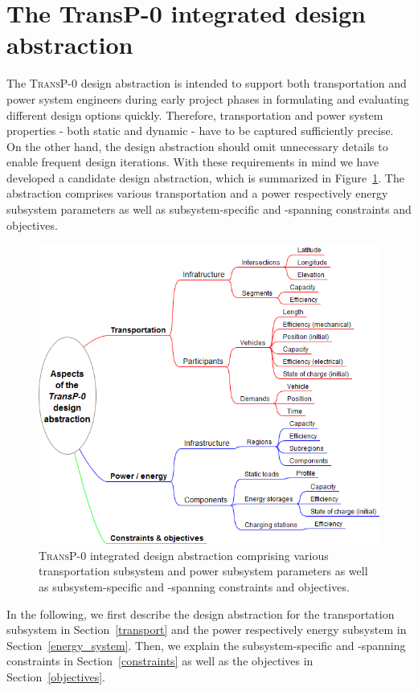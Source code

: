 \section{The \textbf{TransP-0} integrated design abstraction}
\label{proposed_model}

The \textsc{TransP-0} design abstraction is intended to support both transportation and power system engineers during early project phases in formulating and evaluating different design options quickly. Therefore, transportation and power system properties - both static and dynamic - have to be captured sufficiently precise. On the other hand, the design abstraction should omit unnecessary details to enable frequent design iterations. With these requirements in mind we have developed a candidate design abstraction, which is summarized in Figure~\ref{system_design}. The abstraction comprises various transportation and a power respectively energy subsystem parameters as well as subsystem-specific and -spanning constraints and objectives.

\begin{figure}[h!]
	\includegraphics[width=\columnwidth]{./gfx/system_design.png}
	\caption{\textsc{TransP-0} integrated design abstraction comprising various transportation subsystem and power subsystem parameters as well as subsystem-specific and -spanning constraints and objectives.}
	\label{system_design}
\end{figure}

In the following, we first describe the design abstraction for the transportation subsystem in Section~\ref{transport} and the power respectively energy subsystem in Section~\ref{energy_system}. Then, we explain the subsystem-specific and -spanning constraints in Section~\ref{constraints} as well as the objectives in Section~\ref{objectives}. 

